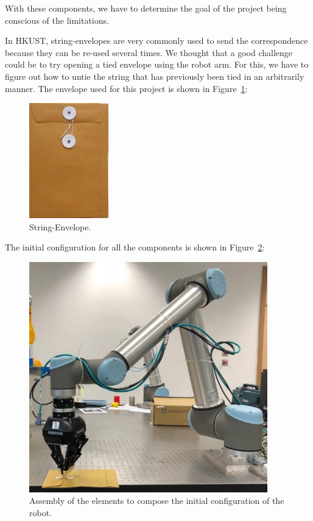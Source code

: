 With these components, we have to determine the goal of the project being conscious of the limitations.

In HKUST, string-envelopes are very commonly used to send the correspondence because they can be re-used several times. We thought that a good challenge could be to try opening a tied envelope using the robot arm. For this, we have to figure out how to untie the string that has previously been tied in an arbitrarily manner. The envelope used for this project is shown in Figure~\ref{fig:envelope}:
\begin{figure}[htbp]
	\centering
	\includegraphics[height=50mm]{chapters/figures/intro/envelope.jpg}
	\caption{String-Envelope.}
	\label{fig:envelope}
\end{figure}

The initial configuration for all the components is shown in Figure~\ref{fig:assembly}:
\begin{figure}[htbp]
\centering
\includegraphics[height=100mm]{chapters/figures/intro/assembly.jpg}
\caption{Assembly of the elements to compose the initial configuration of the robot.}
\label{fig:assembly}
\end{figure}

